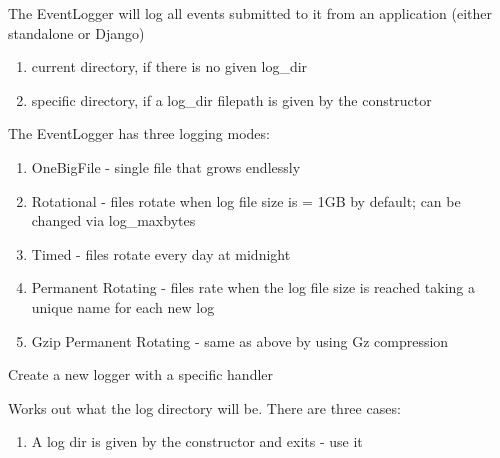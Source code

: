 \documentclass[letterpaper,10pt,english]{sphinxmanual}
\begin{document}
\begin{fulllineitems}
\label{api3.0:puppy.logging.EventLogger}
The EventLogger will log all events submitted to it from an application (either standalone or Django)
\begin{enumerate}
\item {} 
current directory, if there is no given log\_dir

\item {} 
specific directory, if a log\_dir filepath is given by the constructor

\end{enumerate}

The EventLogger has three logging modes:
\begin{enumerate}
\item {} 
OneBigFile - single file that grows endlessly

\item {} 
Rotational - files rotate when log file size is = 1GB by default; can be changed via log\_maxbytes

\item {} 
Timed - files rotate every day at midnight

\item {} 
Permanent Rotating - files rate when the log file size is reached taking a unique name for each new log

\item {} 
Gzip Permanent Rotating - same as above by using Gz compression

\end{enumerate}

\begin{fulllineitems}
\label{api3.0:puppy.logging.EventLogger.create_logger}
Create a new logger with a specific handler

\end{fulllineitems}


\begin{fulllineitems}
\label{api3.0:puppy.logging.EventLogger.get_log_dir}
Works out what the log directory will be. There are three cases:
\begin{enumerate}
\item {} 
A log dir is given by the constructor and exits - use it


\end{enumerate}
\end{fulllineitems}
\end{fulllineitems}
\end{document}
